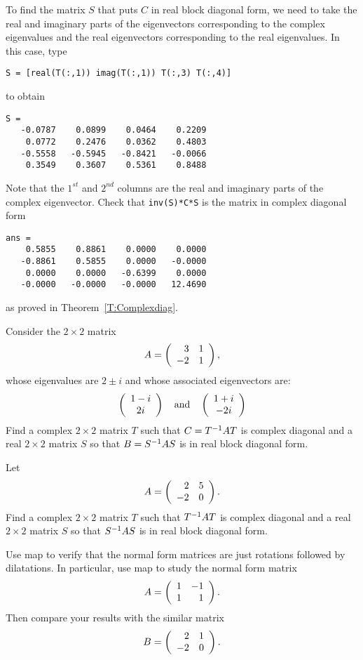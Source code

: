 To find the matrix $S$ that puts $C$ in real block diagonal form, we
need to take the real and imaginary parts of the eigenvectors 
corresponding to the complex eigenvalues and the real eigenvectors 
corresponding to the real eigenvalues.  In this case, type
\begin{verbatim}
S = [real(T(:,1)) imag(T(:,1)) T(:,3) T(:,4)]
\end{verbatim}
to obtain 
\begin{verbatim}
S =
   -0.0787    0.0899    0.0464    0.2209
    0.0772    0.2476    0.0362    0.4803
   -0.5558   -0.5945   -0.8421   -0.0066
    0.3549    0.3607    0.5361    0.8488
\end{verbatim} 
Note that the $1^{st}$ and $2^{nd}$ columns are the real and 
imaginary parts of the complex eigenvector.  Check that 
{\tt inv(S)*C*S} is the matrix in complex diagonal form
\begin{verbatim}
ans = 
    0.5855    0.8861    0.0000    0.0000
   -0.8861    0.5855    0.0000   -0.0000
    0.0000    0.0000   -0.6399    0.0000
   -0.0000   -0.0000   -0.0000   12.4690
\end{verbatim}
as proved in Theorem~\ref{T:Complexdiag}.



\EXER

\TEXER


\begin{exercise}  \label{c10.4.3}
Consider the $2\times 2$ matrix 
\[
A = \left(\begin{array}{rr} 3 & 1\\ -2 &1\end{array}\right),
\]
whose eigenvalues are $2\pm i$ and whose associated eigenvectors are:
\[
\left(\begin{array}{c} 1-i \\ 2i\end{array}\right) \quad\mbox{and}\quad \left(\begin{array}{c} 1+i \\ -2i\end{array}\right)
\]
Find a complex $2\times 2$ matrix $T$ such that $C=T^{-1} AT$ is complex
diagonal and a real $2\times 2$ matrix $S$ so that $B=S^{-1} AS$ is in real
block diagonal form.
\end{exercise}

\begin{exercise}  \label{c10.4.4}
Let 
\[
A=\left(\begin{array}{rr} 2 & 5\\ -2 &0\end{array}\right).
\]
Find a complex $2\times 2$ matrix $T$ such that $T^{-1} AT$ is complex
diagonal and a real $2\times 2$ matrix $S$ so that $S^{-1} AS$ is in real
block diagonal form.
\end{exercise}



\CEXER

\begin{exercise} \label{c10.4.rotate}
Use {\sf map} to verify that 
the normal form matrices  are 
just rotations followed by dilatations.  In particular, use {\sf map} to 
study the normal form matrix
\[
A = \left(\begin{array}{rr} 1 & -1\\ 1 &1\end{array}\right).
\]
Then compare your results with the similar matrix
\[
B = \left(\begin{array}{rr} 2 & 1\\ -2 &0\end{array}\right).
\]
\end{exercise}

